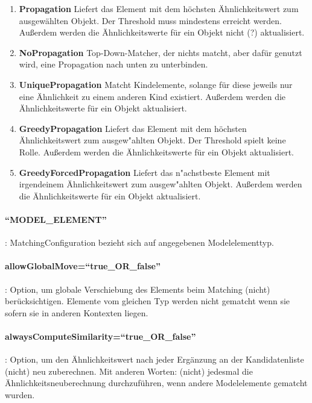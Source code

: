 \documentclass{article}
\begin{document}
\begin{enumerate}
  \item \textbf{Propagation}
  Liefert das Element mit dem höchsten Ähnlichkeitswert
  zum ausgewählten Objekt. Der Threshold muss mindestens erreicht werden. Außerdem
  werden die Ähnlichkeitswerte für ein Objekt nicht (?) aktualisiert.
  \item \textbf{NoPropagation}
  Top-Down-Matcher, der nichts matcht, aber dafür genutzt
  wird, eine Propagation nach unten zu unterbinden.
  \item \textbf{UniquePropagation}
  Matcht Kindelemente, solange für diese jeweils nur
  eine Ähnlichkeit zu einem anderen Kind existiert. Außerdem werden die
  Ähnlichkeitswerte für ein Objekt aktualisiert.
  \item \textbf{GreedyPropagation}
  Liefert das Element mit dem höchsten
  Ähnlichkeitswert zum ausgew"ahlten Objekt. Der Threshold spielt keine Rolle.
  Außerdem werden die Ähnlichkeitswerte für ein Objekt aktualisiert.
  \item \textbf{GreedyForcedPropagation}
  Liefert das n"achstbeste Element mit
  irgendeinem Ähnlichkeitswert zum ausgew"ahlten Objekt. Außerdem werden die
  Ähnlichkeitswerte für ein Objekt aktualisiert.
\end{enumerate}



\paragraph{``MODEL\_ELEMENT''}:
MatchingConfiguration bezieht sich auf angegebenen Modelelementtyp.

\paragraph{allowGlobalMove=``true\_OR\_false''}:
Option, um globale Verschiebung des Elements beim Matching (nicht)
berücksichtigen. Elemente vom gleichen Typ werden nicht gematcht wenn
sie sofern sie in anderen Kontexten liegen.

\paragraph{alwaysComputeSimilarity=``true\_OR\_false''}: Option, um den
Ähnlichkeitswert nach jeder Ergänzung an der Kandidatenliste (nicht) neu
zuberechnen. Mit anderen Worten: (nicht) jedesmal die Ähnlichkeitsneuberechnung
durchzuführen, wenn andere Modelelemente gematcht wurden.
\end{document}
